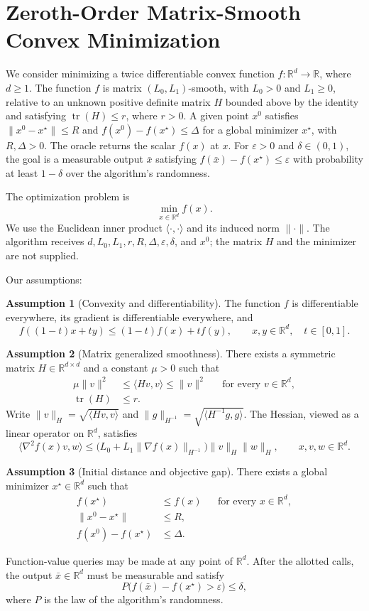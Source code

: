 \documentclass[10pt]{article}
\theoremstyle{definition}
\newtheorem{assumption}{Assumption}
\begin{document}
\section*{Zeroth-Order Matrix-Smooth Convex Minimization}
We consider minimizing a twice differentiable convex function $f:\mathbb{R}^d\to\mathbb{R}$, where $d\geq1$. The function $f$ is matrix $(L_0,L_1)$-smooth, with $L_0>0$ and $L_1\geq0$, relative to an unknown positive definite matrix $H$ bounded above by the identity and satisfying $\operatorname{tr}(H)\leq r$, where $r>0$. A given point $x^0$ satisfies $\|x^0-x^\star\|\leq R$ and $f(x^0)-f(x^\star)\leq\Delta$ for a global minimizer $x^\star$, with $R,\Delta>0$. The oracle returns the scalar $f(x)$ at $x$. For $\varepsilon>0$ and $\delta\in(0,1)$, the goal is a measurable output $\bar{x}$ satisfying $f(\bar{x})-f(x^\star)\leq\varepsilon$ with probability at least $1-\delta$ over the algorithm's randomness.

The optimization problem is
\[
\min_{x\in\mathbb{R}^d} f(x).
\]
We use the Euclidean inner product $\langle\cdot,\cdot\rangle$ and its induced norm $\|\cdot\|$. The algorithm receives $d,L_0,L_1,r,R,\Delta,\varepsilon,\delta$, and $x^0$; the matrix $H$ and the minimizer are not supplied.

Our assumptions:
\begin{assumption}[Convexity and differentiability]
The function $f$ is differentiable everywhere, its gradient is differentiable everywhere, and
\[
f((1-t)x+ty)\leq(1-t)f(x)+tf(y),
\qquad x,y\in\mathbb{R}^d,\quad t\in[0,1].
\]
\end{assumption}

\begin{assumption}[Matrix generalized smoothness]
There exists a symmetric matrix $H\in\mathbb{R}^{d\times d}$ and a constant $\mu>0$ such that
\[
\begin{aligned}
\mu\|v\|^2&\leq\langle Hv,v\rangle\leq\|v\|^2
&&\text{for every }v\in\mathbb{R}^d,\\
\operatorname{tr}(H)&\leq r.
\end{aligned}
\]
Write $\|v\|_H=\sqrt{\langle Hv,v\rangle}$ and $\|g\|_{H^{-1}}=\sqrt{\langle H^{-1}g,g\rangle}$. The Hessian, viewed as a linear operator on $\mathbb{R}^d$, satisfies
\[
\langle\nabla^2 f(x)v,w\rangle
\leq\bigl(L_0+L_1\|\nabla f(x)\|_{H^{-1}}\bigr)
\|v\|_H\|w\|_H,
\qquad x,v,w\in\mathbb{R}^d.
\]
\end{assumption}

\begin{assumption}[Initial distance and objective gap]
There exists a global minimizer $x^\star\in\mathbb{R}^d$ such that
\[
\begin{aligned}
f(x^\star)&\leq f(x) &&\text{for every }x\in\mathbb{R}^d,\\
\|x^0-x^\star\|&\leq R,\\
f(x^0)-f(x^\star)&\leq\Delta.
\end{aligned}
\]
\end{assumption}

Function-value queries may be made at any point of $\mathbb{R}^d$. After the allotted calls, the output $\bar{x}\in\mathbb{R}^d$ must be measurable and satisfy
\[
P\bigl(f(\bar{x})-f(x^\star)>\varepsilon\bigr)\leq\delta,
\]
where $P$ is the law of the algorithm's randomness.
\end{document}
